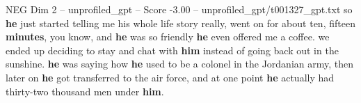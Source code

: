 \begin{textsample}{NEG Dim 2 – unprofiled\_gpt – Score -3.00 – unprofiled\_gpt/t001327\_gpt.txt}  \label{ex:f2_neg_021}
so \textbf{he} just started telling me his whole life story really, went on for about ten, fifteen \textbf{minutes}, you know, and \textbf{he} was so friendly \textbf{he} even offered me a coffee. we ended up deciding to stay and chat with \textbf{him} instead of going back out in the sunshine. \textbf{he} was saying how \textbf{he} used to be a colonel in the Jordanian army, then later on \textbf{he} got transferred to the air force, and at one point \textbf{he} actually had thirty-two thousand men under \textbf{him}.

\end{textsample}
